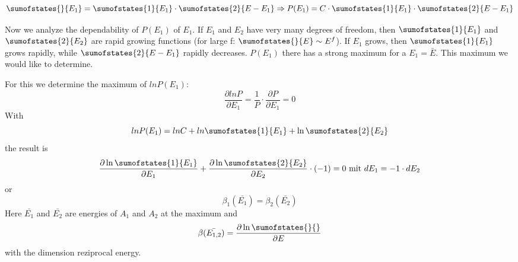 \documentclass[12pt]{article}
\begin{document}
\begin{module}[id=mytemparature,uses=probability-intro]
\begin{equation}
\sumofstates{}{E_1}=\sumofstates{1}{E_1} \cdot \sumofstates{2}{E-E_1}\Rightarrow P(E_1)=C \cdot \sumofstates{1}{E_1}
  \cdot \sumofstates{2}{E-E_1}
\end{equation}

Now we analyze the dependability of $P(E_1)$ of $E_1$.
If $E_1$ and $E_2$ have very many degrees of freedom, then 
$\sumofstates{1}{E_1}$ and $\sumofstates{2}{E_2}$ are rapid growing functions 
(for large f: $\sumofstates{}{E}\sim E^f$).
If $E_1$ grows, then $\sumofstates{1}{E_1}$ grows rapidly, 
while $\sumofstates{2}{E-E_1}$ rapidly decreases. 
$P(E_1)$ there has a strong maximum for a $E_1=\bar{E}$. 
This maximum we would like to determine.

For this we determine the maximum of $lnP(E_1)$:
\begin{equation}
 \frac{\partial lnP}{\partial E_1}=\frac{1}{P} \cdot \frac{\partial P}{\partial E_1}=0
\end{equation}
With\\
\begin{equation}
 lnP(E_1)=lnC+ln\sumofstates{1}{E_1}+\ln\sumofstates{2}{E_2}
\end{equation}
the result is\\
\begin{equation}
 \frac{\partial \ln\sumofstates{1}{E_1}}{\partial E_1}+\frac{\partial \ln\sumofstates{2}{E_2}}
{\partial E_2} \cdot (-1)=0 \mbox{ mit }dE_1=-1 \cdot dE_2
\end{equation}
or\\
\begin{equation}
 \beta_1(\bar{E_1})=\beta_2(\bar{E_2})
\end{equation}
Here $\bar{E_1}$ and $\bar{E_2}$ are energies of $A_1$ and $A_2$ 
at the maximum and 
\begin{equation}
\beta (\bar{E_{1,2}})=\frac{\partial \ln\sumofstates{}{}}{\partial E}
\end{equation} with  
the dimension reziprocal energy.\\


\end{module}
\end{document}
